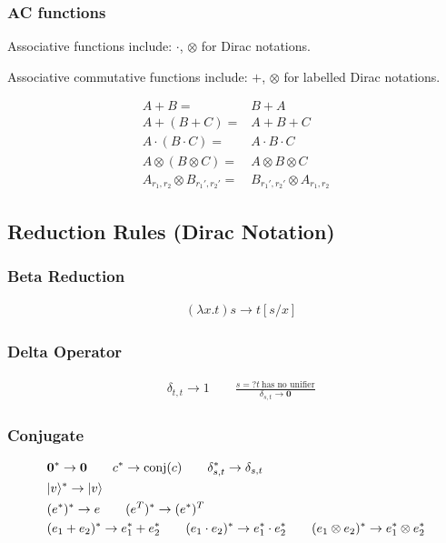 \subsubsection*{AC functions}

Associative functions include: $\cdot$, $\otimes$ for Dirac notations. 

Associative commutative functions include: $+$, $\otimes$ for labelled Dirac notations.

\begin{align*}
    A + B = & B + A \\
    A + (B + C) = & A + B + C \\
    A \cdot (B \cdot C) = & A \cdot B \cdot C \\
    A \otimes (B \otimes C) = & A \otimes B \otimes C \\
    A_{r_1, r_2} \otimes B_{r_1', r_2'} = & B_{r_1', r_2'} \otimes A_{r_1, r_2}
\end{align*}


\subsection{Reduction Rules (Dirac Notation)}

\subsubsection*{Beta Reduction}
\begin{align*}
    & (\lambda x.t) s \to t[s/x]
\end{align*}


\subsubsection*{Delta Operator}
\begin{align*}
  & \delta_{t, t} \to 1
  \qquad
  \frac{s =? t\ \textrm{has no unifier}}{\delta_{s, t} \to \mathbf{0}}
\end{align*}

\subsubsection*{Conjugate}
\begin{align*}
  & \textbf{0}^* \to \textbf{0}
  \qquad 
  c^* \to \mathrm{conj}(c)
  \qquad 
  \delta_{s,t}^* \to \delta_{s,t}\\
  & |v\rangle^* \to |v\rangle \\
  & (e^*)^* \to e
  \qquad 
  (e^T)^* \to (e^*)^T\\
  & (e_1 + e_2)^* \to e_1^* + e_2^* 
  \qquad (e_1 \cdot e_2)^* \to e_1^* \cdot e_2^* 
  \qquad (e_1 \otimes e_2)^* \to e_1^* \otimes e_2^*
\end{align*}

